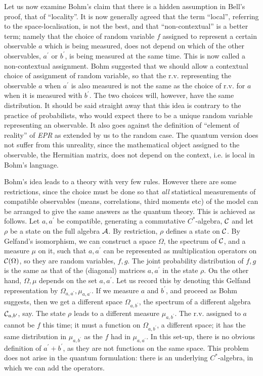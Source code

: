 Let us now examine Bohm's claim that there is a hidden
assumption in Bell's proof, that of ``locality''. It is now generally
agreed that the term ``local'', referring to the space-localisation,
is not the best, and that ``non-contextual'' is a better term; namely
that the choice of random variable $f$ assigned to represent a certain
observable $a$ which is being measured, does not depend on which of the
other observables, $a^\prime$ or $b^\prime$, is being measured at the
same time. This is now called a non-contextual assignment.
Bohm suggested that we should allow a contextual choice of
assignment of random variable, so that the r.v. representing the observable
$a$ when $a^\prime$ is also measured is not the same as the choice of r.v.
for $a$ when it is measured with $b^\prime$.
The two choices will, however, have the
same distribution. It should be said straight away that this idea is
contrary to the practice of probabilists, who would expect there to be
a unique random variable representing an observable. It also goes against
the definition of ``element of reality'' of {\em EPR} as extended by us
to the random case. The quantum version does not suffer from this unreality,
since the mathematical object assigned to the observable, the Hermitian
matrix, does not depend on the context, i.e. is local in Bohm's language.

Bohm's idea leads to a theory with very few rules.
However there are some restrictions, since the choice must
be done so that {\em all}
statistical measurements of compatible observables (means, correlations,
third moments etc) of the
model can be arranged to give the same answers as the quantum theory.
This is achieved as follows. Let $a,a^\prime$
be compatible, generating a commutative
$C^*$-algebra, ${\cal C}$ and let $\rho$ be a state on the full algebra
${\cal A}$. By restriction, $\rho$ defines a state on ${\cal C}$.
By Gelfand's isomorphism,
we can construct a space $\Omega$, the spectrum
of ${\cal C}$, and a measure $\mu$ on it, such that $a,a^\prime$ can be
represented as multiplication operators on ${\cal C}(\Omega)$, so
they are random variables, $f,g$. The joint probability
distribution of $f,g$ is the same as that of the (diagonal) matrices
$a,a^\prime$ in the state $\rho$.
On the other hand, $\Omega,\mu$ depends on the  set $a,a^\prime$. Let
us record this by denoting this Gelfand representation by $\Omega_{a,
a^\prime},\mu_{a,a^\prime}$. If we
measure $a$ and $b^\prime$, and proceed as Bohm suggests, then we get a
different space $\Omega_{a,b^\prime}$, the spectrum of a different algebra
${\cal C}_{a,b^\prime}$, say. The state $\rho$ leads to a different measure
$\mu_{a,b^\prime}$.
The r.v. assigned to $a$ cannot be $f$ this time;
it must a function on $\Omega_{a,b^\prime}$, a different space;
it has the same distribution in $\mu_{a,b^\prime}$ as the $f$ had in
$\mu_{a,a^\prime}$. In this set-up, there is no obvious definition of
$a^\prime+b^\prime$, as they are not functions on the same space.
This problem does not arise in the quantum formulation:
there is an underlying $C^*$-algebra, in which we can add the operators.

